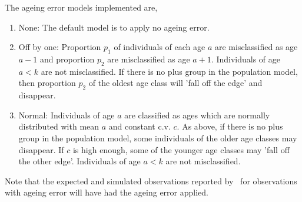 The ageing error models implemented are,
\begin{enumerate}
	\item{None}: The default model is to apply no ageing error.
	\item{Off by one}: Proportion $p_1$ of individuals of each age $a$ are misclassified as age $a-1$ and proportion $p_2$ are misclassified as age $a+1$. Individuals of age $a < k$ are not misclassified. If there is no plus group in the population model, then proportion $p_2$ of the oldest age class will 'fall off the edge' and disappear. 
	\item{Normal}: Individuals of age $a$ are classified as ages which are normally distributed with mean $a$ and constant c.v. $c$. As above, if there is no plus group in the population model, some individuals of the older age classes may disappear. If $c$ is high enough, some of the younger age classes may 'fall off the other edge'. Individuals of age $a < k$ are not misclassified.
\end{enumerate}

Note that the expected and simulated observations reported by \IBM\ for observations with ageing error will have had the ageing error applied. 

